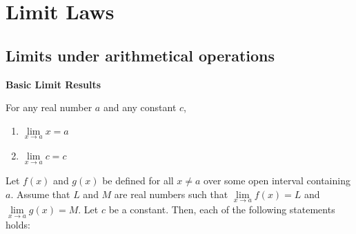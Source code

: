 
\section{Limit Laws}

\hypertarget{limits-under-arithmetical-operations}{%
\subsection{Limits under arithmetical
operations}\label{limits-under-arithmetical-operations}}

\noindent\textbf{Basic Limit Results}

For any real number \(a\) and any constant \(c\),

\begin{enumerate}[sepno]
\item
  \(\lim\limits_{x\to a}x=a\)
\item
  \(\lim\limits_{x\to a}c=c\)
\end{enumerate}

Let \(f(x)\) and \(g(x)\) be defined for all \(x\neq a\) over some open
interval containing \(a\). Assume that \(L\) and \(M\) are real numbers
such that \(\lim\limits_{x\to a}f(x)=L\) and
\(\lim\limits_{x\to a}g(x)=M\). Let \(c\) be a constant. Then, each of
the following statements holds:

